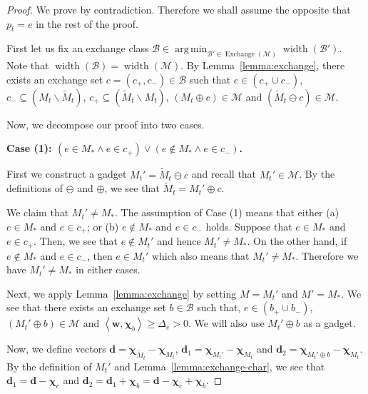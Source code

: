 \documentclass{article}
\newcommand{\M}{\mathcal M}
\newcommand{\B}{\mathcal B}
\newcommand{\del}{\backslash}
\DeclareMathOperator{\rank}{width}
\DeclareMathOperator*{\argmin}{arg\,min}
\DeclareMathOperator{\Exchange}{Exchange}
\newcommand{\inn}[1]{\left\langle #1 \right\rangle}
\renewcommand{\vec}[1]{\boldsymbol{#1}}
\begin{document}
\begin{proof}
We prove by contradiction. Therefore we shall assume the opposite that $p_t = e$ in the rest of the proof.

First let us fix an exchange class $\B\in \argmin_{\B'\in \Exchange(\M)} \rank(\B')$.
Note that $\rank(\B) = \rank(\M)$.
By Lemma~\ref{lemma:exchange}, there exists an exchange set $c=(c_+,c_-) \in \B$
such that $e\in (c_+\cup c_-)$, $c_- \subseteq (M_t \del \tilde M_t)$, $c_+ \subseteq (\tilde M_t \del M_t)$, $(M_t\oplus c) \in \M$ and $(\tilde M_t \ominus c) \in \M$.


Now, we decompose our proof into two cases.

\textbf{Case (1): $(e \in M_* \wedge e\in c_+) \vee (e \not \in M_* \wedge e\in c_-)$.}

First we construct a gadget $M_t' = \tilde M_t \ominus c$ and recall that $M_t' \in \M$. 
By the definitions of $\ominus$ and $\oplus$, we see that $\tilde M_t = M_t' \oplus c$.

We claim that $M_t'\not= M_*$.
The assumption of Case (1) means that either (a) $e\in M_*$ and $e\in c_+$; or (b) $e\not \in M_*$ and $e\in c_-$ holds.
Suppose that $e\in M_*$ and $e\in c_+$.
Then, we see that $e\not\in M_t'$ and hence $M_t'\not=M_*$.
On the other hand, if $e\not \in M_*$ and $e\in c_-$, then $e\in M_t'$ which also means that $M_t'\not= M_*$.
Therefore we have $M_t'\not=M_*$ in either cases.


Next, we apply Lemma~\ref{lemma:exchange} by setting $M=M_t'$ and $M'=M_*$.
We see that there exists an exchange set $b\in \B$ such that, $e\in (b_+\cup b_-)$, $(M_t' \oplus b) \in \M$ and
 $\inn{\vec w, \vec \chi_b} \ge \Delta_e > 0$.
We will also use $M_t'\oplus b$ as a gadget.

Now, we define vectors $\vec d = \vec \chi_{\tilde M_t} - \vec \chi_{M_t}$, $\vec d_1 = \vec\chi_{M_t'}-\vec\chi_{M_t}$ and $\vec d_2 = \vec\chi_{M_t'\oplus b}-\vec\chi_{M_t}$.
By the definition of $M_t'$ and Lemma~\ref{lemma:exchange-char}, we see that $\vec d_1 = \vec d - \vec \chi_{c}$ and $\vec d_2 = \vec d_1+\vec \chi_b = \vec d-\vec \chi_c+\vec \chi_b$.



\end{proof}
\end{document}
